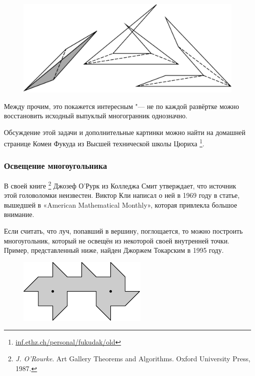\documentclass[twoside]{book}
\begin{document}
\begin{figure}[!ht]
\centering
\includegraphics[scale=0.5]{Figs/UnsolvedPuzzles/unfold}
\end{figure}

Между прочим, это покажется интересным "--- не по каждой развёртке можно восстановить исходный выпуклый многогранник однозначно. %

Обсуждение этой задачи и дополнительные картинки можно найти на домашней странице Комеи Фукуда из Высшей технической школы Цюриха%
\footnote{\href{https://inf.ethz.ch/personal/fukudak/old/}{\url{inf.ethz.ch/personal/fukudak/old}}}.

\subsubsection*{Освещение многоугольника}

В своей книге%
\footnote{\emph{J. O'Rourke}. {Art Gallery Theorems and Algorithms.} Oxford University Press, 1987.}
Джозеф О’Рурк %
из Колледжа Смит утверждает, что источник этой головоломки неизвестен.
Виктор Кли написал о ней в 1969 году в статье, вышедшей в «American Mathe\-ma\-tical Monthly», которая привлекла большое внимание. 

Если считать, что луч, попавший в вершину, поглощается, то можно построить многоугольник, который не освещён из некоторой своей внутренней точки.
Пример, представленный ниже, найден Джоржем Токарским в 1995 году.

\begin{figure}[!ht]
\centering
\includegraphics{mp/wink-31}
\end{figure} 
\end{document}
